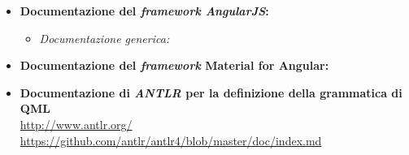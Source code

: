 \begin{itemize}
	\item \textbf{Documentazione del \textit{framework AngularJS}:}
	\begin{itemize}
		\item \textit{Documentazione generica:}
	\end{itemize}
	\item \textbf{Documentazione del \textit{framework} Material for Angular:}
	\item \textbf{Documentazione di \textit{ANTLR} per la definizione della grammatica di QML} \\
	\url{http://www.antlr.org/} \\
	\url{https://github.com/antlr/antlr4/blob/master/doc/index.md}
\end{itemize}
